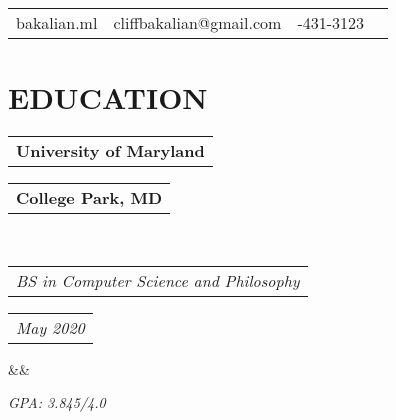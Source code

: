 \documentclass[11pt,a4paper,roman]{moderncv}
\makeatletter
\newcommand*{\customcventry}[7][.25em]{
  \begin{tabular}{@{}l} 
    {\bfseries #4}
  \end{tabular}
  \hfill
  \begin{tabular}{l@{}}
     {\bfseries #5}
  \end{tabular} \\
  \begin{tabular}{@{}l} 
    {\itshape #3}
  \end{tabular}
  \hfill
  \begin{tabular}{l@{}}
     {\itshape #2}
  \end{tabular}
  \ifx&#7&%
  \else{\\%
    \begin{minipage}{\maincolumnwidth}%
      \small#7%
    \end{minipage}}\fi%
  \par\addvspace{#1}}
\makeatother
\begin{document}
\makecvtitle
\vspace*{-23mm}

\begin{center}
\begin{tabular}{ c c c c }
 \enspace bakalian.ml & \enspace cliffbakalian@gmail.com & \enspace 215-431-3123\\  
\end{tabular}
\end{center}

\section{EDUCATION}
{\customcventry{May 2020}{BS in Computer Science and Philosophy}{University of Maryland}{College Park, MD}{}{}}
\hfill {\itshape GPA: 3.845/4.0}
\end{document}
